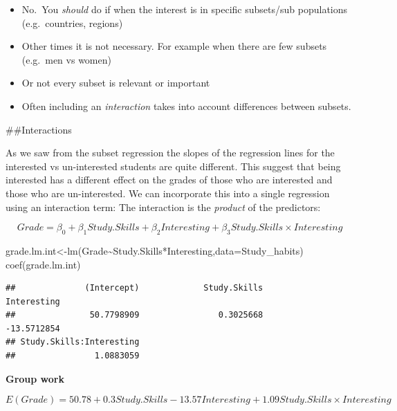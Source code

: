 \documentclass[
]{gitbook}
\newenvironment{Shaded}{\begin{snugshade}}{\end{snugshade}}
\newcommand{\AttributeTok}[1]{\textcolor[rgb]{0.77,0.63,0.00}{#1}}
\newcommand{\FunctionTok}[1]{\textcolor[rgb]{0.00,0.00,0.00}{#1}}
\newcommand{\NormalTok}[1]{#1}
\newcommand{\OtherTok}[1]{\textcolor[rgb]{0.56,0.35,0.01}{#1}}
\newcommand{\SpecialCharTok}[1]{\textcolor[rgb]{0.00,0.00,0.00}{#1}}
\providecommand{\tightlist}{%
  \setlength{\itemsep}{0pt}\setlength{\parskip}{0pt}}
\begin{document}
\begin{itemize}
\tightlist
\item
  No.~You \emph{should} do if when the interest is in specific subsets/sub populations (e.g.~countries, regions)
\item
  Other times it is not necessary. For example when there are few subsets (e.g.~men vs women)
\item
  Or not every subset is relevant or important
\item
  Often including an \emph{interaction} takes into account differences between subsets.
\end{itemize}

\#\#Interactions

As we saw from the subset regression the slopes of the regression lines for the interested vs un-interested students are quite different. This suggest that being interested has a different effect on the grades of those who are interested and those who are un-interested. We can incorporate this into a single regression using an interaction term: The interaction is the \emph{product} of the predictors:

\[ Grade =  \beta_0 + \beta_1 Study.Skills+ \beta_2 Interesting+ \beta_3 Study.Skills \times Interesting\]

\begin{Shaded}
\begin{Highlighting}[]
\NormalTok{grade.lm.int}\OtherTok{\textless{}{-}}\FunctionTok{lm}\NormalTok{(Grade}\SpecialCharTok{\textasciitilde{}}\NormalTok{Study.Skills}\SpecialCharTok{*}\NormalTok{Interesting,}\AttributeTok{data=}\NormalTok{Study\_habits)}
\FunctionTok{coef}\NormalTok{(grade.lm.int)}
\end{Highlighting}
\end{Shaded}

\begin{verbatim}
##              (Intercept)             Study.Skills              Interesting 
##               50.7798909                0.3025668              -13.5712854 
## Study.Skills:Interesting 
##                1.0883059
\end{verbatim}

\textbf{Group work}

\[ E(Grade) =50.78+ 0.3 Study.Skills -13.57 Interesting + 1.09 Study.Skills \times Interesting \]

\end{document}

